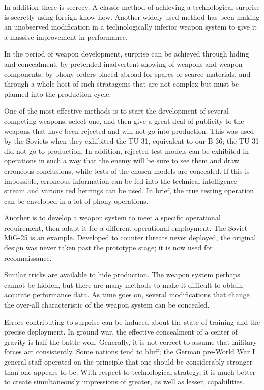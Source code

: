 In addition there is secrecy. A classic method of achieving a technological surprise is secretly using foreign know-how. Another widely used method has been making an unobserved modification in a technologically inferior weapon system to give it a massive improvement in performance.

In the period of weapon development, surprise can be achieved through hiding and concealment, by pretended inadvertent showing of weapons and weapon components, by phony orders placed abroad for spares or scarce materials, and through a whole host of such stratagems that are not complex but must be planned into the production cycle.

One of the most effective methods is to start the development of several competing weapons, select one, and then give a great deal of publicity to the weapons that have been rejected and will not go into production. This was used by the Soviets when they exhibited the TU-31, equivalent to our B-36; the TU-31 did not go to production. In addition, rejected test models can be exhibited in operations in such a way that the enemy will be sure to see them and draw erroneous conclusions, while tests of the chosen models are concealed. If this is impossible, erroneous information can be fed into the technical intelligence stream and various red herrings can be used. In brief, the true testing operation can be enveloped in a lot of phony operations.

Another is to develop a weapon system to meet a specific operational requirement, then adapt it for a different operational employment. The Soviet MiG-25 is an example. Developed to counter threats never deployed, the original design was never taken past the prototype stage; it is now used for reconnaissance.

Similar tricks are available to hide production. The weapon system perhaps cannot be hidden, but there are many methods to make it difficult to obtain accurate performance data. As time goes on, several modifications that change the over-all characteristic of the weapon system can be concealed.

Errors contributing to surprise can be induced about the state of training and the precise deployment. In ground war, the effective concealment of a center of gravity is half the battle won. Generally, it is not correct to assume that military forces act consistently. Some nations tend to bluff; the German pre-World War I general staff operated on the principle that one should be considerably stronger than one appears to be. With respect to technological strategy, it is much better to create simultaneously impressions of greater, as well as lesser, capabilities.

